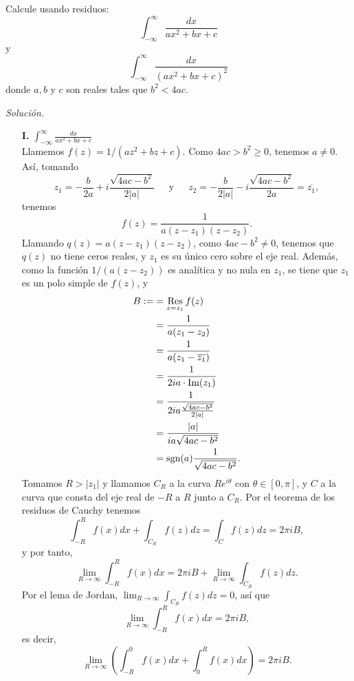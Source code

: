 \begin{Ejc}
   Calcule usando residuos:
   $$
   \int_{-\infty}^{\infty}\frac{dx}{ax^2+bx+c} 
   $$
   y
   $$
   \int_{-\infty}^{\infty}\frac{dx}{\left( ax^2+bx+c\right)^2}
   $$
   donde $a, b$ y $c$ son reales tales que $b^2<4ac$.
\end{Ejc}
\textit{Solución.}{
   \begin{itemize}
      \item[\textbf{I.}]$\int_{-\infty}^{\infty}\frac{dx}{ax^2+bx+c}$\\
         Llamemos $f(z)=1/(az^2+bz+c)$. Como $4ac>b^2\geq0$, tenemos $a\neq 0$. Así, tomando
         $$
         z_1=-\frac{b}{2a}+i\frac{\sqrt{4ac-b^2}}{2|a|}\phantom{000}\text{y}\phantom{000}z_2=-\frac{b}{2|a|}-i\frac{\sqrt{4ac-b^2}}{2a}=\overline{z_1},
         $$
         tenemos
         $$
         f(z)=\frac{1}{a(z-z_1)(z-z_2)}.
         $$
         Llamando $q(z)=a(z-z_1)(z-z_2)$, como $4ac-b^2\neq 0$, tenemos que $q(z)$ no tiene ceros reales, y $z_1$ es su único cero sobre el eje real. Además, como la función $1/(a(z-z_2))$ es analítica y no nula en $z_1$, se tiene que $z_1$ es un polo simple de $f(z)$, y
         $$
         \begin{aligned}
            B:=&=\mathop{\mathrm{Res}}\limits_{z=z_1}f(z)\\
               &=\frac{1}{a(z_1-z_2)}\\
               &=\frac{1}{a(z_1-\overline{z_1})}\\
               &=\frac{1}{2ia\cdot\text{Im}(z_1)}\\
               &=\frac{1}{2ia\frac{\sqrt{4ac-b^2}}{2|a|}}\\
               &=\frac{|a|}{ia\sqrt{4ac-b^2}}\\
               &=\normalfont{\text{sgn}}(a)\frac{1}{\sqrt{4ac-b^2}}.
         \end{aligned}
         $$
         Tomamos $R>|z_1|$ y llamamos $C_R$ a la curva $Re^{i\theta}$ con $\theta\in[0,\pi]$, y $C$ a la curva que consta del eje real de $-R$ a $R$ junto a $C_R$. Por el teorema de los residuos de Cauchy tenemos
         $$
         \int_{-R}^{R}f(x)dx+\int_{C_R}f(z)dz=\int_{C}f(z)dz=2\pi i B,
         $$
         y por tanto,
         $$
         \lim_{R\to\infty}\int_{-R}^{R}f(x)dx=2\pi i B + \lim_{R\to\infty}\int_{C_R}f(z)dz.
         $$
         Por el lema de Jordan, $\lim_{R\to\infty}\int_{C_R} f(z)dz=0$, así que
         $$
         \lim_{R\to\infty}\int_{-R}^{R}f(x)dx=2\pi i B,
         $$
         es decir, 
         $$
         \lim_{R\to\infty}\left( \int_{-R}^{0}f(x)dx+\int_{0}^{R}f(x)dx\right)=2 \pi i B.
$$
\end{itemize}}
